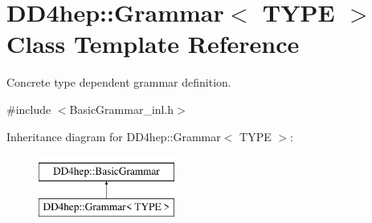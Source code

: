 \hypertarget{class_d_d4hep_1_1_grammar}{}\section{D\+D4hep\+:\+:Grammar$<$ T\+Y\+PE $>$ Class Template Reference}
\label{class_d_d4hep_1_1_grammar}


Concrete type dependent grammar definition.  




{\ttfamily \#include $<$Basic\+Grammar\+\_\+inl.\+h$>$}

Inheritance diagram for D\+D4hep\+:\+:Grammar$<$ T\+Y\+PE $>$\+:\begin{figure}[H]
\begin{center}
\leavevmode
\includegraphics[height=2.000000cm]{class_d_d4hep_1_1_grammar}
\end{center}
\end{figure}

